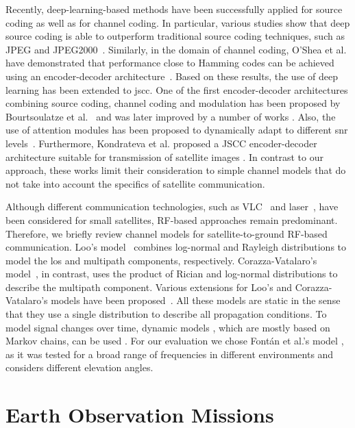 \documentclass[conference]{IEEEtran}
\begin{document}
Recently, deep-learning-based methods have been successfully applied for source coding as well as for channel coding. In particular, various studies show that deep source coding is able to outperform traditional source coding techniques, such as JPEG and JPEG2000~\cite{toderici2016variable, ballé2017endtoend, Hu2022}.
Similarly, in the domain of channel coding, O'Shea et al. have demonstrated that performance close to Hamming codes can be achieved using an encoder-decoder architecture~\cite{8054694}. 
Based on these results, the use of deep learning has been extended to \ac{jscc}.
One of the first encoder-decoder architectures combining source coding, channel coding and modulation has been proposed by Bourtsoulatze et al.~\cite{Bourtsoulatze2019} and was later improved by a number of works \cite{Xuan2021,Kurka2021,yang2021_2}.
Also, the use of attention modules has been proposed to dynamically adapt to different \ac{snr} levels~\cite{9438648}. 
Furthermore, Kondrateva et al. proposed a JSCC encoder-decoder architecture suitable for transmission of satellite images \cite{satjscc}.
In contrast to our approach, these works limit their consideration to simple channel models that do not take into account the specifics of satellite communication.

Although different communication technologies, such as VLC~\cite{nakajima2012} and laser~\cite{welle2018}, have been considered for small satellites, RF-based approaches remain predominant.
Therefore, we briefly review channel models for satellite-to-ground RF-based communication.   
Loo's model~\cite{1623307} combines log-normal and Rayleigh distributions to model the \ac{los} and multipath components, respectively.
Corazza-Vatalaro's model~\cite{Corazza1994ASM}, in contrast, uses the product of Rician and log-normal distributions to describe the multipath component. 
Various extensions for Loo's and Corazza-Vatalaro's models have been proposed~\cite{596315, 661055}.
All these models are static in the sense that they use a single distribution to describe all propagation conditions.
To model signal changes over time, dynamic models \cite{966585,4151152,7779114,8693582}, which are mostly based on Markov chains, can be used \cite{9079470}.
For our evaluation we chose Fontán et al.'s model \cite{966585}, as it was tested for a broad range of frequencies in different environments and considers different elevation angles.


\section{Earth Observation Missions}
\label{sec:system_model}
\end{document}
